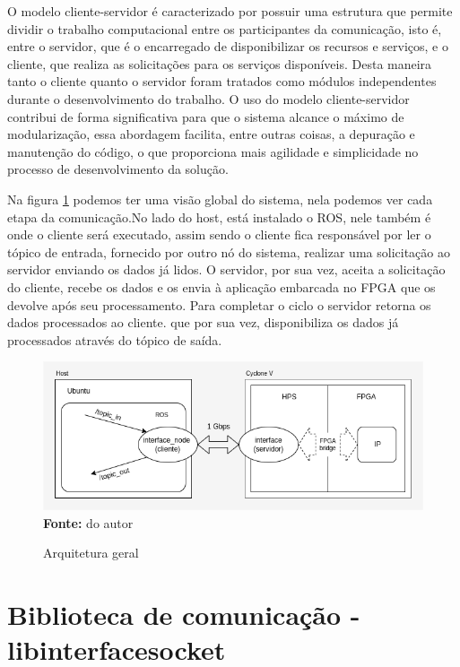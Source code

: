 O modelo cliente-servidor é caracterizado por possuir uma estrutura que permite dividir o trabalho computacional entre os participantes da comunicação, isto é, entre o servidor, que é o encarregado de disponibilizar os recursos e serviços, e o cliente, que realiza as solicitações para os serviços disponíveis.  Desta maneira tanto o cliente quanto o servidor foram tratados como módulos independentes durante o desenvolvimento do trabalho. O uso do modelo cliente-servidor contribui de forma significativa para que o sistema alcance o máximo de modularização, essa abordagem facilita, entre outras coisas, a depuração e manutenção do código, o que proporciona mais agilidade e simplicidade no processo de desenvolvimento da solução.


Na figura \ref{fig:arquitetura} podemos ter uma visão global do sistema, nela podemos ver cada etapa da comunicação.No lado do host, está instalado o ROS, nele também é onde o cliente será executado, assim sendo o cliente fica responsável por ler o tópico de entrada, fornecido por outro nó do sistema, realizar uma solicitação ao servidor enviando os dados já lidos. O servidor, por sua vez, aceita a solicitação do cliente, recebe os dados e os envia à aplicação embarcada no FPGA que os devolve após seu processamento. Para completar o ciclo o servidor retorna os dados processados ao cliente. que por sua vez, disponibiliza os dados já processados através do tópico de saída. 

\begin{figure}[ht]
	\caption{Arquitetura geral}
	\begin{center}
		\includegraphics[scale=0.7]{imagens/arquitetura_geral.png}\\
		{\small \textbf{Fonte:} do autor}
    \end{center}
    \label{fig:arquitetura}
\end{figure}




\section{Biblioteca de comunicação - libinterfacesocket}

